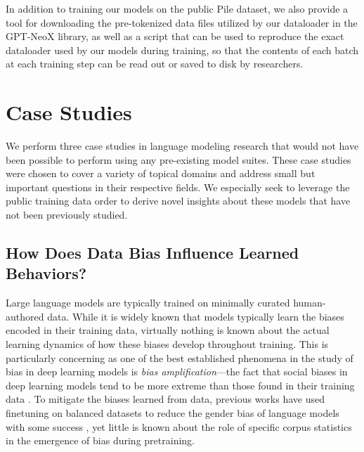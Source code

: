 In addition to training our models on the public Pile dataset, we also provide a tool for downloading the pre-tokenized data files utilized by our dataloader in the GPT-NeoX library, as well as a script that can be used to reproduce the exact dataloader used by our models during training, so that the contents of each batch at each training step can be read out or saved to disk by researchers.

\section{Case Studies}\label{sec:case-studies}

We perform three case studies in language modeling research that would not have been possible to perform using any pre-existing model suites. These case studies were chosen to cover a variety of topical domains and address small but important questions in their respective fields. We especially seek to leverage the public training data order to derive novel insights about these models that have not been previously studied.

\subsection{How Does Data Bias Influence Learned Behaviors?} \label{bias_section}
Large language models are typically trained on minimally curated human-authored data. While it is widely known that models typically learn the  biases encoded in their training data, virtually nothing is known about the actual learning dynamics of how these biases develop throughout training. This is particularly concerning as one of the best established phenomena in the study of bias in deep learning models is \textit{bias amplification}---the fact that social biases in deep learning models tend to be more extreme than those found in their training data \citep{zhao2017men,hirota2022quantifying,hall2022systematic}. To mitigate the biases learned from data, previous works have used finetuning on balanced datasets to reduce the gender bias of language models with some success \citep{levy2021collecting,gira2022debiasing,kirtane2022efficient}, yet little is known about the role of specific corpus statistics in the emergence of bias during pretraining.

